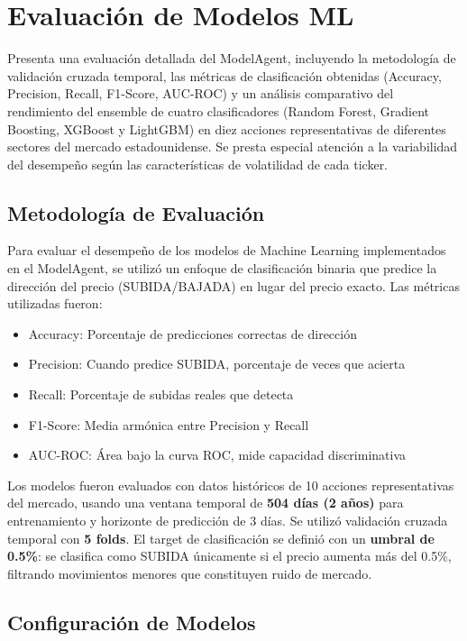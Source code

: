 \section{Evaluación de Modelos ML}
\label{sec:evaluacion-ml}

Presenta una evaluación detallada del ModelAgent, incluyendo la metodología de validación cruzada temporal, las métricas de clasificación obtenidas (Accuracy, Precision, Recall, F1-Score, AUC-ROC) y un análisis comparativo del rendimiento del ensemble de cuatro clasificadores (Random Forest, Gradient Boosting, XGBoost y LightGBM) en diez acciones representativas de diferentes sectores del mercado estadounidense. Se presta especial atención a la variabilidad del desempeño según las características de volatilidad de cada ticker.

\subsection{Metodología de Evaluación}

Para evaluar el desempeño de los modelos de Machine Learning implementados en el ModelAgent, se utilizó un enfoque de clasificación binaria que predice la dirección del precio (SUBIDA/BAJADA) en lugar del precio exacto. Las métricas utilizadas fueron:

\begin{itemize}
    \item Accuracy: Porcentaje de predicciones correctas de dirección
    \item Precision: Cuando predice SUBIDA, porcentaje de veces que acierta
    \item Recall: Porcentaje de subidas reales que detecta
    \item F1-Score: Media armónica entre Precision y Recall
    \item AUC-ROC: Área bajo la curva ROC, mide capacidad discriminativa
\end{itemize}

Los modelos fueron evaluados con datos históricos de 10 acciones representativas del mercado, usando una ventana temporal de \textbf{504 días (2 años)} para entrenamiento y horizonte de predicción de 3 días. Se utilizó validación cruzada temporal con \textbf{5 folds}. El target de clasificación se definió con un \textbf{umbral de 0.5\%}: se clasifica como SUBIDA únicamente si el precio aumenta más del 0.5\%, filtrando movimientos menores que constituyen ruido de mercado.

\subsection{Configuración de Modelos}

